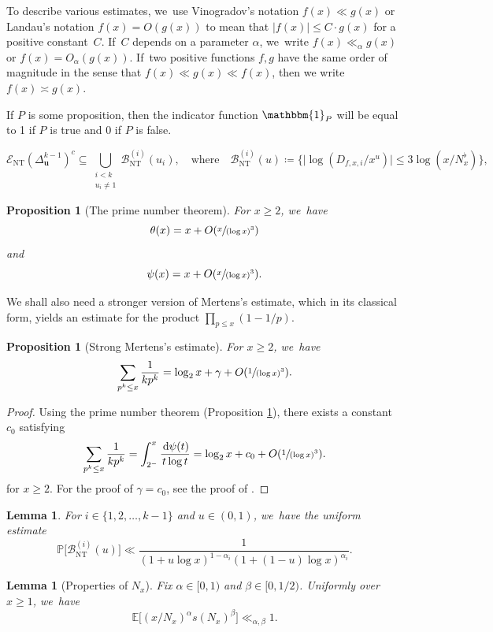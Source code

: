 \documentclass[10pt,a4paper]{article}
\newcommand{\bigO}[1]{O(#1)}
\newcommand{\PP}{\mathbb{P}}
\newcommand{\EE}{\mathbb{E}}
\newcommand{\dee}{\,\mathrm{d}}
\newcommand{\one}{\mathbbm{1}}
\newcommand{\EC}{\mathcal{E}}
\newcommand{\bigoo}[1]{O\!\left(#1 \right)}
\newcommand{\abs}[1]{\left\lvert #1 \right\rvert}
\newcommand{\simplex}{\Delta^{k-1}}
\newcommand{\bg}{\big}
\newcommand{\bgg}{\Big}
\newcommand{\ECnt}{\EC_{\mathrm{NT}}}
\newcommand{\Bnt}{\mathcal{B}_{\mathrm{NT}}}
\theoremstyle{plain}
\newtheorem{lem}[cor]{Lemma}
\newtheorem{prop}[cor]{Proposition}
\theoremstyle{definition}
\begin{document}
To describe various estimates, we~use Vinogradov's notation $f(x) \ll g(x)$ or Landau's notation $f(x) = \bigoo{g(x)}$ to mean that $\abs{f(x)} \le C\cdot g(x)$ for a positive constant~$C$. If~$C$ depends on a parameter $\alpha$, we~write $f(x) \ll_\alpha g(x)$ or $f(x) = O_\alpha(g(x))$. If~two positive functions $f, g$ have the same order of magnitude in the sense that $f(x) \ll g(x) \ll f(x)$, then we write $f(x) \asymp g(x)$.

If $P$ is some proposition, then the indicator function $\one _P$ will be equal to 1 if $P$ is true and $0$ if $P$ is false.

\[
\ECnt(\simplex_{\mathbf{u}})^c\subseteq\! \bigcup_{\substack{i<k \\ u_i\neq 1}} \Bnt^{(i)}(u_i),
\quad\text{where}\quad
\Bnt^{(i)}(u) \coloneqq \bgg\{ \bg| \log(D_{f,x,i}/x^u)\bg|\le 3\log(x/N_x^\flat) \bgg\},
\]

\begin{prop}[The prime number theorem]
\label{pnt}
For $x \ge 2$, we~have
\[
\theta(x) = x + \bigO{\sfrac{x}{(\log x)^3}}
\]
and
\[
\psi(x) = x+\bigO{\sfrac{x}{(\log x)^3}}.
\]
\end{prop}

We shall also need a stronger version of Mertens's estimate, which in its classical form, yields an estimate for the product $\prod_{p \le x} (1-1/p)$.

\begin{prop}[Strong Mertens's estimate]
\label{prop:mertens}
For $x \ge 2$, we~have
\[
\sum_{p^k \le x} \frac{1}{kp^k} = \log_2 x + \gamma + \bigO{\sfrac{1}{(\log x)^3}}.
\]
\end{prop}

\begin{proof}
Using the prime number theorem (Proposition \ref{pnt}), there exists a constant $c_0$ satisfying
\[
\sum_{p^k \le x} \frac{1}{kp^k} = \int_{2^-}^x \frac{\dee \psi(t)}{t\log t} = \log_2 x + c_0 + \bigO{\sfrac{1}{(\log x)^3}}.
\]
for $x \ge 2$. For the proof of $\gamma = c_0$, see the proof of \cite[Th.\,2.7]{MV07}.
\end{proof}

\begin{lem}
\label{lem:bound of prob of ECnt}
For $i\in\{1,2,\dots,k-1\}$ and $u\in(0,1)$, we~have the uniform estimate
\[
\PP\bg[\Bnt^{(i)}(u) \bg] \ll \frac{1}{(1+ u\log x)^{1-\alpha_i}(1+(1-u)\log x)^{\alpha_i}}.
\]
\end{lem}

\begin{lem}[Properties of $N_x$]
\label{lem:properties of N}
Fix $\alpha\in[0,1)$ and $\beta\in[0,1/2)$. Uniformly over $x\ge1$, we~have
\[
\EE\bg[(x/N_x)^\alpha s(N_x)^\beta\bg] \ll_{\alpha,\beta} 1.
\]
\end{lem}
\end{document}
